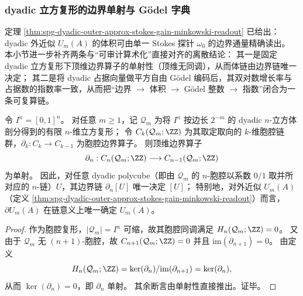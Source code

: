 
\subsubsection{dyadic 立方复形的边界单射与 Gödel 字典}\label{subsubsec:spg-dyadic-holography-godelization}
定理 \ref{thm:spg-dyadic-outer-approx-stokes-gain-minkowski-readout} 已给出：dyadic 外近似 \(U_m(A)\) 的体积可由单一 Stokes 探针 \(\omega_0\) 的边界通量精确读出。
本小节进一步补齐两条与“可审计算术化”直接对齐的离散结论：
其一是固定 dyadic 立方复形下顶维边界算子的单射性（顶维无同调），从而体链由边界链唯一决定；
其二是将 dyadic 占据向量做平方自由 Gödel 编码后，其双对数增长率与占据数的指数率一致，从而把“边界 \(\to\) 体积 \(\to\) Gödel 整数 \(\to\) 指数”闭合为一条可复算链。

\begin{theorem}\label{thm:spg-dyadic-cubical-boundary-injective}
令 \(I^n=[0,1]^n\)。
对任意 \(m\ge 1\)，记 \(\mathcal Q_m\) 为将 \(I^n\) 按边长 \(2^{-m}\) 的 dyadic \(n\)-立方体剖分得到的有限 \(n\)-维立方复形；
令 \(C_k(\mathcal Q_m;\ZZ)\) 为其取定取向的 \(k\)-维胞腔链群，\(\partial_k:C_k\to C_{k-1}\) 为胞腔边界算子。
则顶维边界算子
\[
\partial_n:C_n(\mathcal Q_m;\ZZ)\longrightarrow C_{n-1}(\mathcal Q_m;\ZZ)
\]
为单射。
因此，对任意 dyadic polycube（即由 \(\mathcal Q_m\) 的 \(n\)-胞腔以系数 \(0/1\) 取并所对应的 \(n\)-链）\(U\)，其边界链 \(\partial_n[U]\) 唯一决定 \([U]\)；
特别地，对外近似 \(U_m(A)\)（定义 \ref{thm:spg-dyadic-outer-approx-stokes-gain-minkowski-readout}）而言，\(\partial U_m(A)\) 在链意义上唯一确定 \(U_m(A)\)。
\end{theorem}
\begin{proof}
作为胞腔复形，\(|\mathcal Q_m|=I^n\) 可缩，故其胞腔同调满足 \(H_n(\mathcal Q_m;\ZZ)=0\)。
又由于 \(\mathcal Q_m\) 无 \((n+1)\)-胞腔，故 \(C_{n+1}(\mathcal Q_m;\ZZ)=0\) 并且 \(\mathrm{im}(\partial_{n+1})=0\)。
由定义
\[
H_n(\mathcal Q_m;\ZZ)=\ker(\partial_n)/\mathrm{im}(\partial_{n+1})=\ker(\partial_n),
\]
从而 \(\ker(\partial_n)=0\)，即 \(\partial_n\) 单射。
其余断言由单射性直接推出。证毕。
\end{proof}

